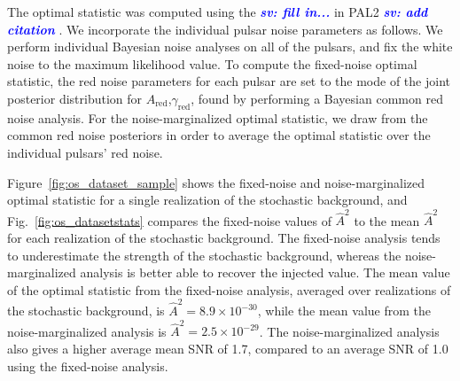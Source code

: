\documentclass[twocolumn,aps,prd,superscriptaddress]{revtex4-1}
\newcommand{\sv}[1]{\textcolor{blue}{\it{\textbf{sv: #1}}} }
\begin{document}
The optimal statistic was computed using the \sv{fill in...} in PAL2 \sv{add citation}. 
We incorporate the individual pulsar noise parameters as follows. 
We perform individual Bayesian noise analyses on all of the pulsars, and 
fix the white noise to the maximum likelihood value. 
To compute the fixed-noise optimal statistic, 
the red noise parameters for each pulsar are set to the mode of 
the joint posterior distribution for $A_\mathrm{red}$,$\gamma_\mathrm{red}$, 
found by performing a Bayesian common red noise analysis. 
For the noise-marginalized optimal statistic, we draw from 
the common red noise posteriors in order to average the optimal statistic over 
the individual pulsars' red noise.

Figure~\ref{fig:os_dataset_sample} shows the fixed-noise and noise-marginalized 
optimal statistic for a single realization of the stochastic background, 
and Fig.~\ref{fig:os_datasetstats} compares the fixed-noise values of $\hat{A}^2$ 
to the mean $\hat{A}^2$ for each realization of the stochastic background. 
The fixed-noise analysis tends to underestimate the strength of the stochastic background, 
whereas the noise-marginalized analysis is better able to recover the injected value. 
The mean value of the optimal statistic from the fixed-noise analysis, 
averaged over realizations of the stochastic background, is $\hat{A}^2 = 8.9 \times 10^{-30}$, 
while the mean value from the noise-marginalized analysis is $\hat{A}^2 = 2.5 \times 10^{-29}$. 
The noise-marginalized analysis also gives a higher average mean SNR of 1.7, 
compared to an average SNR of 1.0 using the fixed-noise analysis.
\end{document}
